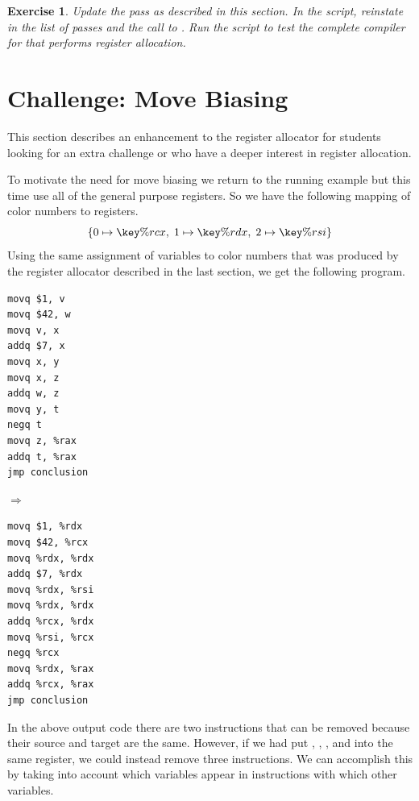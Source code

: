 \documentclass[11pt]{book}
\newtheorem{exercise}[theorem]{Exercise}
\begin{document}
\begin{exercise}\normalfont
Update the  pass as described in this section.
%
In the  script, reinstate  in the
list of passes and the call to .
%
Run the script to test the complete compiler for \LangVar{} that
performs register allocation.
\end{exercise}

\section{Challenge: Move Biasing}
\label{sec:move-biasing}

This section describes an enhancement to the register allocator for
students looking for an extra challenge or who have a deeper interest
in register allocation.

To motivate the need for move biasing we return to the running example
but this time use all of the general purpose registers.  So we have
the following mapping of color numbers to registers.
\[
  \{ 0 \mapsto \key{\%rcx}, \; 1 \mapsto \key{\%rdx}, \; 2 \mapsto \key{\%rsi} \}
\]
Using the same assignment of variables to color numbers that was
produced by the register allocator described in the last section, we
get the following program.
\begin{center}
\begin{minipage}{0.3\textwidth}
\begin{lstlisting}
movq $1, v
movq $42, w
movq v, x
addq $7, x
movq x, y
movq x, z
addq w, z
movq y, t
negq t
movq z, %rax
addq t, %rax
jmp conclusion
\end{lstlisting}
\end{minipage}
$\Rightarrow\qquad$
\begin{minipage}{0.45\textwidth}
\begin{lstlisting}
movq $1, %rdx
movq $42, %rcx
movq %rdx, %rdx
addq $7, %rdx
movq %rdx, %rsi
movq %rdx, %rdx
addq %rcx, %rdx
movq %rsi, %rcx
negq %rcx
movq %rdx, %rax
addq %rcx, %rax
jmp conclusion
\end{lstlisting}
\end{minipage}
\end{center}
In the above output code there are two  instructions that
can be removed because their source and target are the same.  However,
if we had put , , , and  into the same
register, we could instead remove three  instructions.  We
can accomplish this by taking into account which variables appear in
 instructions with which other variables.
\end{document}
